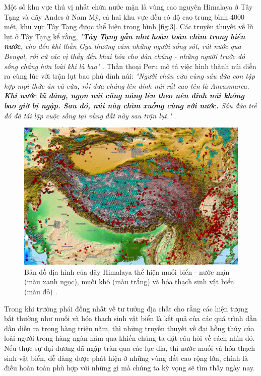 \documentclass[10pt,twocolumn,letterpaper]{article}
\begin{document}
Một số khu vực thú vị nhất chứa nước mặn là vùng cao nguyên Himalaya ở Tây Tạng và dãy Andes ở Nam Mỹ, cả hai khu vực đều có độ cao trung bình 4000 mét, khu vực Tây Tạng được thể hiện trong hình \ref{fig:3}. Các truyền thuyết về lũ lụt ở Tây Tạng kể rằng, \textit{"\textbf{Tây Tạng gần như hoàn toàn chìm trong biển nước}, cho đến khi thần Gya thương cảm những người sống sót, rút nước qua Bengal, rồi cử các vị thầy đến khai hóa cho dân chúng - những người trước đó sống chẳng hơn loài khỉ là bao"} \cite{3}. Thần thoại Peru mô tả việc hình thành núi diễn ra cùng lúc với trận lụt bao phủ đỉnh núi: \textit{"Người chăn cừu cùng sáu đứa con tập hợp mọi thức ăn và cừu, rồi đưa chúng lên đỉnh núi rất cao tên là Ancasmarca. \textbf{Khi nước lũ dâng, ngọn núi cũng nâng lên theo nên đỉnh núi không bao giờ bị ngập. Sau đó, núi này chìm xuống cùng với nước.} Sáu đứa trẻ đó đã tái lập cuộc sống tại vùng đất này sau trận lụt."} \cite{3}.
\begin{figure}[t]
\begin{center}
   \includegraphics[width=1\linewidth]{tibet.jpg}
\end{center}
   \caption{Bản đồ địa hình của dãy Himalaya thể hiện muối biển - nước mặn (màu xanh ngọc), muối khô (màu trắng) và hóa thạch sinh vật biển (màu đỏ) \cite{15,16,86,87}.}
\label{fig:3}
\label{fig:onecol}
\end{figure}

Trong khi trường phái đồng nhất về tư tưởng địa chất cho rằng các hiện tượng bất thường như muối và hóa thạch sinh vật biển là kết quả của các quá trình dần dần diễn ra trong hàng triệu năm, thì những truyền thuyết về đại hồng thủy của loài người trong hàng ngàn năm qua khiến chúng ta đặt câu hỏi về cách nhìn đó. Nếu thực sự đại dương đã ngập tràn qua các lục địa, thì nước muối và hóa thạch sinh vật biển, dễ dàng được phát hiện ở những vùng đất cao rộng lớn, chính là điều hoàn toàn phù hợp với những gì mà chúng ta kỳ vọng sẽ tìm thấy ngày nay.
\end{document}
